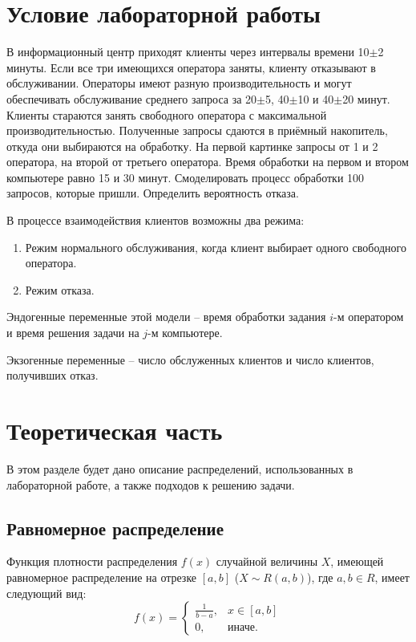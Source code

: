 \setcounter{page}{2}
\section{Условие лабораторной работы}
В информационный центр приходят клиенты через интервалы времени 10$\pm$2 минуты. Если все три имеющихся оператора заняты, клиенту отказывают в обслуживании. Операторы имеют разную производительность и могут обеспечивать обслуживание среднего запроса за 20$\pm$5, 40$\pm$10 и 40$\pm$20 минут. Клиенты стараются занять свободного оператора с максимальной производительностью. Полученные запросы сдаются в приёмный накопитель, откуда они выбираются на обработку. На первой картинке запросы от 1 и 2 оператора, на второй от третьего оператора. Время обработки на первом и втором компьютере равно 15 и 30 минут. Смоделировать процесс обработки 100 запросов, которые пришли. Определить вероятность отказа.

В процессе взаимодействия клиентов возможны два режима:
\begin{enumerate}
	\item Режим нормального обслуживания, когда клиент выбирает одного свободного оператора.
	\item Режим отказа.
\end{enumerate}

Эндогенные переменные этой модели -- время обработки задания $i$-м оператором и время решения задачи на $j$-м компьютере.

Экзогенные переменные -- число обслуженных клиентов и число клиентов, получивших отказ.

\newpage

\section{Теоретическая часть}
В этом разделе будет дано описание распределений, использованных в лабораторной работе, а также подходов к решению задачи.

\subsection{Равномерное распределение}

Функция плотности распределения $f(x)$ случайной величины $X$, имеющей равномерное распределение на отрезке $[a, b]$ ($X \sim R(a, b)$), где $a, b \in R$, имеет следующий вид:
\begin{equation}
	f(x)=\begin{cases}
		\frac{1}{b - a}, & x \in [a, b] \\
		0, & \text{иначе}.
	\end{cases}
\end{equation}

